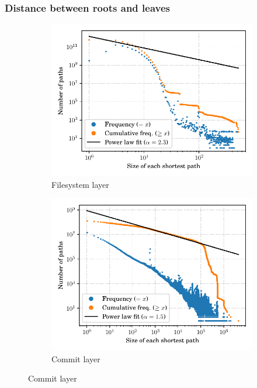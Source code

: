 \documentclass[aspectratio=169,xcolor=table]{beamer}
\begin{document}
    \begin{frame}
        \frametitle{Distance between roots and leaves}
        \begin{figure}
            \begin{subfigure}{.49\textwidth}
                \centering
                \includegraphics[width=\linewidth]{../img/topology/shortestpath/dir+cnt}
                \caption{Filesystem layer}
            \end{subfigure}\hfill
            \begin{subfigure}{.49\textwidth}
                \centering
                \includegraphics[width=\linewidth]{../img/topology/shortestpath/rev}
                \caption{Commit layer}
            \end{subfigure}
        \end{figure}
    \end{frame}
\end{document}
